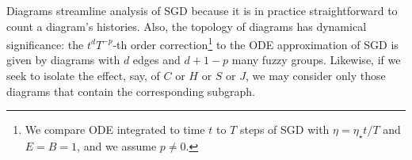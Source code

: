             Diagrams streamline analysis of SGD because it is in practice
            straightforward to count a diagram's histories.  
            Also, the topology of diagrams has dynamical significance: the $t^d
            T^{-p}$-th order correction\footnote{We compare ODE integrated to
            time $t$ to $T$ steps of SGD with $\eta = \eta_\star t/T$ and
            $E=B=1$, and we assume $p\neq 0$.} to the ODE approximation of SGD
            is given by diagrams with $d$ edges and $d+1-p$ many fuzzy groups.
            Likewise, if we seek to isolate the effect, say, of $C$ or $H$ or
            $S$ or $J$, we may consider only those diagrams that contain the
            corresponding subgraph.







